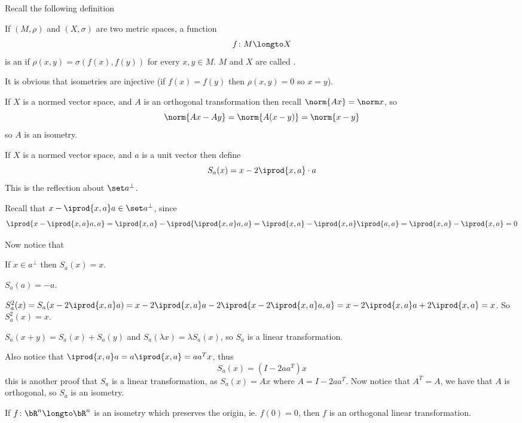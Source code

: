 Recall the following definition

\begin{defn*}

    If $(M,\rho)$ and $(X,\sigma)$ are two metric spaces, a function
    \[ f\colon M\longto X \]
    is an  if $\rho(x,y)=\sigma(f(x),f(y))$ for every $x,y\in M$.
    $M$ and $X$ are called .

\end{defn*}

It is obvious that isometries are injective (if $f(x)=f(y)$ then $\rho(x,y)=0$ so $x=y$).

If $X$ is a normed vector space, and $A$ is an orthogonal transformation then recall $\norm{Ax}=\norm x$, so
\[ \norm{Ax-Ay}=\norm{A(x-y)} = \norm{x-y} \]
so $A$ is an isometry.

\begin{defn*}

    If $X$ is a normed vector space, and $a$ is a unit vector then define
    \[ S_a(x) = x - 2\iprod{x,a}\cdot a \]
    This is the reflection about $\set a^\bot$.

\end{defn*}

Recall that $x-\iprod{x,a}a\in\set a^\bot$, since
\[ \iprod{x-\iprod{x,a}a,a} = \iprod{x,a} - \iprod{\iprod{x,a}a,a} = \iprod{x,a} - \iprod{x,a}\iprod{a,a} = \iprod{x,a} - \iprod{x,a} = 0 \]

Now notice that
\blist
    \item If $x\in a^\bot$ then $S_a(x)=x$.
    \item $S_a(a)=-a$.
    \item $S_a^2(x)=S_a(x-2\iprod{x,a}a)=x-2\iprod{x,a}a-2\iprod{x-2\iprod{x,a}a,a}=x-2\iprod{x,a}a+2\iprod{x,a}=x$.
    So $S_a^2(x)=x$.
    \item $S_a(x+y)=S_a(x)+S_a(y)$ and $S_a(\lambda x)=\lambda S_a(x)$, so $S_a$ is a linear transformation.
\elist

Also notice that $\iprod{x,a}a=a\iprod{x,a}=aa^Tx$, thus
\[ S_a(x) = (I-2aa^T)x \]
this is another proof that $S_a$ is a linear transformation, as $S_a(x)=Ax$ where $A=I-2aa^T$.
Now notice that $A^T=A$, we have that $A$ is orthogonal, so $S_a$ is an isometry.

\begin{prop*}

    If $f\colon\bR^n\longto\bR^n$ is an isometry which preserves the origin, ie. $f(0)=0$, then $f$ is an orthogonal linear transformation.

\end{prop*}

